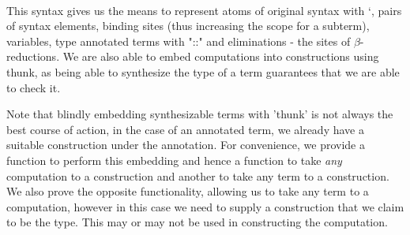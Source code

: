 \begin{code}
\AgdaSpace{}%
\<%
\\
%
\\[\AgdaEmptyExtraSkip]%
\>[0]\AgdaSpace{}%
\AgdaSpace{}%
\AgdaSymbol{:}\AgdaSpace{}%
\AgdaSpace{}%
\AgdaSpace{}%
\AgdaSpace{}%
\AgdaSpace{}%
\AgdaSymbol{:}\AgdaSpace{}%
\<%
\\
%
\\[\AgdaEmptyExtraSkip]%
\>[0]\AgdaSpace{}%
\AgdaSymbol{:}\AgdaSpace{}%
\AgdaSpace{}%
\AgdaSpace{}%
\<%
\\
\>[0]\AgdaSpace{}%
%
\>[12]\AgdaSymbol{=}\AgdaSpace{}%
\<%
\\
\>[0]\AgdaSpace{}%
%
\>[12]\AgdaSymbol{=}\AgdaSpace{}%
\<%
\end{code}

This syntax gives us the means to represent atoms of original syntax
with `, pairs of syntax elements, binding sites (thus increasing the scope
for a subterm), variables, type annotated terms with "::" and eliminations
- the sites of $β$-reductions. We are also able to embed computations into
constructions using thunk, as being able to synthesize the type of a term
guarantees that we are able to check it.

Note that blindly embedding synthesizable terms with 'thunk' is
not always the best course of action, in the case of an annotated
term, we already have a suitable construction under the annotation.
For convenience, we provide a function to perform this embedding and
hence a function to take \emph{any} computation to a construction and
another to take any term to a construction. We also prove the opposite
functionality, allowing us to take any term to a computation, however in
this case we need to supply a construction that we claim to be the type.
This may or may not be used in constructing the computation.

